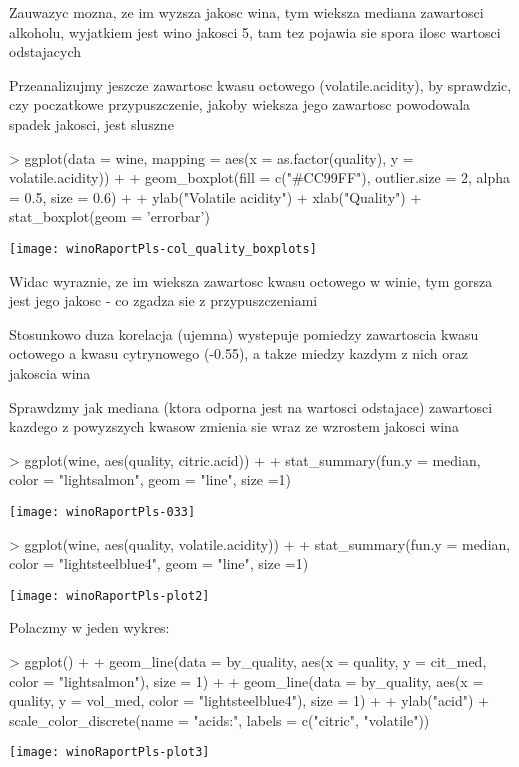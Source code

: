 \documentclass{article}
\begin{document}
Zauwazyc mozna, ze im wyzsza jakosc wina, tym wieksza mediana zawartosci alkoholu,
wyjatkiem jest wino jakosci 5, tam tez pojawia sie spora ilosc wartosci odstajacych



Przeanalizujmy jeszcze zawartosc kwasu octowego (volatile.acidity), by sprawdzic,
czy poczatkowe przypuszczenie, jakoby wieksza jego zawartosc powodowala spadek 
jakosci, jest sluszne

\begin{Schunk}
\begin{Sinput}
> ggplot(data = wine, mapping = aes(x = as.factor(quality), y = volatile.acidity)) + 
+   geom_boxplot(fill = c("#CC99FF"), outlier.size = 2, alpha = 0.5, size = 0.6) +
+   ylab("Volatile acidity") + xlab("Quality") + stat_boxplot(geom = 'errorbar') 
\end{Sinput}
\end{Schunk}
\texttt{[image: winoRaportPls-col\_quality\_boxplots]}

Widac wyraznie, ze im wieksza zawartosc kwasu octowego w winie, tym gorsza jest jego jakosc - co zgadza sie z przypuszczeniami

\vspace{1cm}
Stosunkowo duza korelacja (ujemna) wystepuje pomiedzy zawartoscia kwasu octowego a kwasu cytrynowego (-0.55), a takze miedzy kazdym z nich oraz jakoscia wina

Sprawdzmy jak mediana (ktora odporna jest na wartosci odstajace) zawartosci 
kazdego z powyzszych kwasow zmienia sie wraz ze wzrostem jakosci wina


\begin{Schunk}
\begin{Sinput}
> ggplot(wine, aes(quality, citric.acid)) +
+   stat_summary(fun.y = median, color = "lightsalmon", geom = "line", size =1) 
\end{Sinput}
\end{Schunk}
\texttt{[image: winoRaportPls-033]}

\begin{Schunk}
\begin{Sinput}
> ggplot(wine, aes(quality, volatile.acidity)) +
+   stat_summary(fun.y = median, color = "lightsteelblue4", geom = "line", size =1)
\end{Sinput}
\end{Schunk}
\texttt{[image: winoRaportPls-plot2]}

Polaczmy w jeden wykres:

\begin{Schunk}
\begin{Sinput}
> ggplot() + 
+   geom_line(data = by_quality, aes(x = quality, y = cit_med, color = "lightsalmon"), size = 1) + 
+   geom_line(data = by_quality, aes(x = quality, y = vol_med, color = "lightsteelblue4"), size = 1) +
+   ylab("acid") + scale_color_discrete(name = "acids:", labels = c("citric", "volatile"))
\end{Sinput}
\end{Schunk}
\texttt{[image: winoRaportPls-plot3]}
\end{document}
